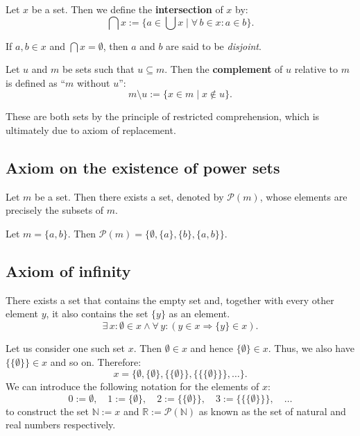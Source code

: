 \documentclass[root.tex]{subfiles}
\begin{document}
\begin{mydef}
  Let $x$ be a set. Then we define the \textbf{intersection} of $x$ by:
  $$
  \bigcap x := \{ a \in \bigcup x \mid \forall \, b \in x : a \in b \}.
  $$
\end{mydef}
If $a,b\in x$ and $\bigcap x = \emptyset$, then $a$ and $b$ are said to be \emph{disjoint}.

\begin{mydef}
  Let $u$ and $m$ be sets such that $u \subseteq m$. Then the \textbf{complement} of $u$ relative to $m$ is defined as ``$m$ without $u$'':
  $$
  m\setminus u := \{x \in m \mid x \notin u\}.
  $$
\end{mydef}

These are both sets by the principle of restricted comprehension, which is ultimately due to axiom of replacement.
\subsection{Axiom on the existence of power sets}
Let $m$ be a set. Then there exists a set, denoted by $\mathcal{P}(m)$, whose elements are precisely the subsets of $m$.

\begin{myex}
  Let $m = \{a,b\}$. Then $\mathcal{P}(m)=\{\emptyset,\{a\},\{b\},\{a,b\}\}$.
\end{myex}

%

\subsection{Axiom of infinity}
There exists a set that contains the empty set and,  together with every other element $y$, it also contains the set $\{y\}$ as an element.
$$
\exists \, x : \emptyset \in x \land \forall \, y : (y\in x \Rightarrow \{y\} \in x).
$$

\begin{corollary}
Let us consider one such set $x$. Then $\emptyset \in x$ and hence $\{\emptyset\}\in x$. Thus, we also have $\{\{\emptyset\}\}\in x$ and so on. Therefore:
$$
x = \{\emptyset,\{\emptyset\},\{\{\emptyset\}\},\{\{\{\emptyset\}\}\},\ldots\}.
$$
We can introduce the following notation for the elements of $x$:
$$
0 :=\emptyset , \quad 1  := \{\emptyset\},\quad 2:= \{\{\emptyset\}\}, \quad 3:= \{\{\{\emptyset\}\}\} , \quad \ldots
$$
to construct the set $\mathbb{N}:=x$ and $\mathbb{R}:= \mathcal{P}(\mathbb{N})$ as known as the set of natural and real numbers respectively.
\end{corollary}
\end{document}
